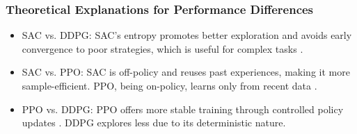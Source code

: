 

\subsubsection{Theoretical Explanations for Performance Differences}
\begin{itemize}
    \item \gls{SAC} vs. \gls{DDPG}: \gls{SAC}'s entropy promotes better exploration and avoids early convergence to poor strategies, which is useful for complex tasks \cite{haarnoja2018softactorcriticoffpolicymaximum}.
    \item \gls{SAC} vs. \gls{PPO}: \gls{SAC} is off-policy and reuses past experiences, making it more sample-efficient. \gls{PPO}, being on-policy, learns only from recent data \cite{schulman2017proximalpolicyoptimizationalgorithms}.
    \item \gls{PPO} vs. \gls{DDPG}: \gls{PPO} offers more stable training through controlled policy updates \cite{schulman2017proximalpolicyoptimizationalgorithms}. \gls{DDPG} explores less due to its deterministic nature.
\end{itemize}

